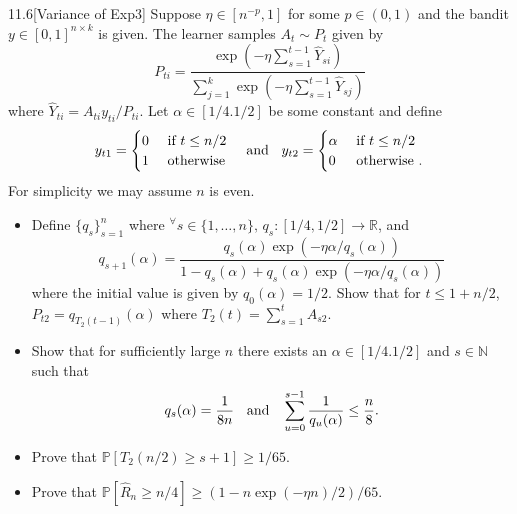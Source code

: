 \documentclass[10pt]{article}
\theoremstyle{definition}
\newenvironment{exercise*}[1]{%
  \IfBlankTF{#1}
    {\renewcommand{\themanualexerciseinner}{\unskip}}
    {\renewcommand\themanualexerciseinner{#1}}%
  \manualexerciseinner
}{\endmanualexerciseinner}
\begin{document}
\begin{exercise*}{11.6}[Variance of Exp3]
    Suppose $\eta \in [n^{-p}, 1]$ for some $p \in (0,1)$ and the bandit $y \in [0,1]^{n \times k}$ is given.
    The learner samples $A_t \sim P_t$ given by
    \begin{equation*}
        P_{ti} = \frac{\exp\left(-\eta\sum_{s=1}^{t-1}\hat{Y}_{si}\right)}{\sum_{j=1}^k \exp \left(-\eta\sum_{s=1}^{t-1}\hat{Y}_{sj}\right)}
    \end{equation*}
    where $\hat{Y}_{ti} = A_{ti}y_{ti}/P_{ti}$. Let $\alpha \in [1/4. 1/2]$ be some constant and define
    \begin{equation*}
        y_{t1} = 
        \begin{cases}
            0 & \text{ if } t \leq n/2 \\
            1 & \text{ otherwise }
        \end{cases}
        \hspace{0.2cm}
        \text{ and }
        \hspace{0.2cm}
        y_{t2} =
        \begin{cases}
            \alpha & \text{ if } t \leq n/2 \\
            0 & \text{ otherwise }.
        \end{cases}
    \end{equation*}
    For simplicity we may assume $n$ is even.
    \begin{itemize}
        \item[(a)] Define $\{q_s\}_{s=1}^n$ where $^\forall s \in \{1, \ldots, n\}, \, q_s:[1/4,1/2] \rightarrow \mathbb{R}$, and
        \begin{equation*}
            q_{s+1}(\alpha) = \frac{q_s(\alpha) \exp(-\eta \alpha/q_s(\alpha))}{1 - q_s(\alpha)+q_s(\alpha)\exp(-\eta\alpha/q_s(\alpha))}
        \end{equation*}
        where the initial value is given by $q_0(\alpha) = 1/2$. Show that for $t \leq 1+ n/2$, $P_{t2} = q_{T_2(t-1)}(\alpha)$ where $T_2(t) = \sum_{s=1}^t A_{s2}$.
        \item[(b)] Show that for sufficiently large $n$ there exists an $\alpha \in [1/4. 1/2]$ and $s \in \mathbb{N}$ such that
        \begin{equation*}
            q_s(\alpha) = \frac{1}{8n} \hspace{0.2cm} \text{ and } \hspace{0.2cm} \sum_{u=0}^{s-1} \frac{1}{q_u(\alpha)} \leq \frac{n}{8}.
        \end{equation*}
        \item[(c)] Prove that $\mathbb{P}[T_2(n/2) \geq s+1] \geq 1/65$.
        \item[(d)] Prove that $\mathbb{P}[\hat{R}_n \geq n/4] \geq (1-n \exp(-\eta n)/2)/65$. 
    \end{itemize}
\end{exercise*}
\end{document}
